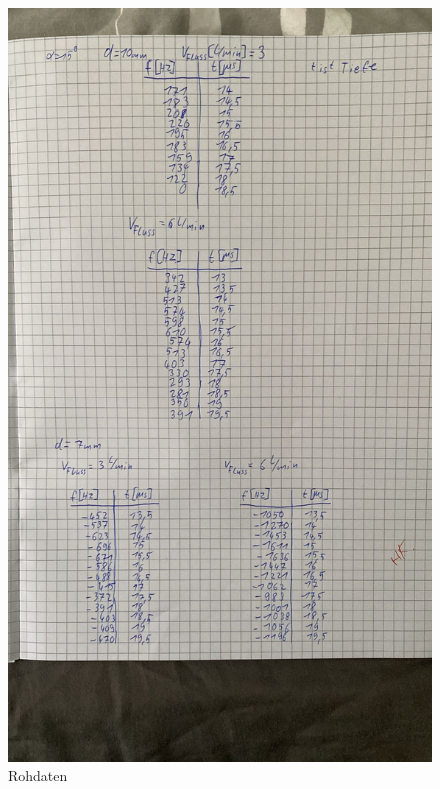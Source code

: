 \begin{figure}[H]
  \includegraphics[width=\textwidth]{Bilder/rohdaten2.jpg}
  \caption{Rohdaten}
\end{figure}


